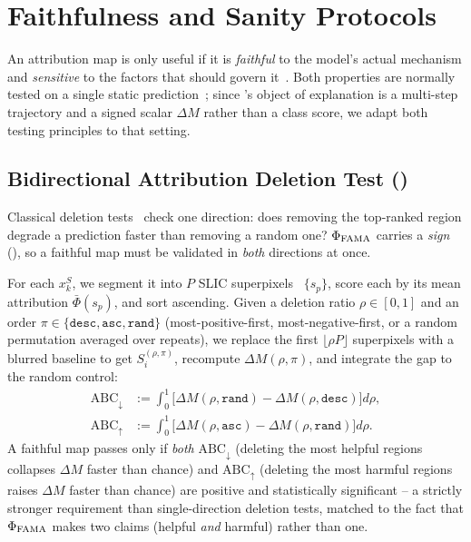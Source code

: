 \section{Faithfulness and Sanity Protocols}
\label{sec:protocols}

An attribution map is only useful if it is \emph{faithful} to the model's actual mechanism and \emph{sensitive} to the factors that should govern it~\cite{eu2019trustworthy}. Both properties are normally tested on a single static prediction~\cite{samek2016evaluating,petsiuk2018rise,adebayo2018sanity}; since \fama's object of explanation is a multi-step trajectory and a signed scalar $\Delta M$ rather than a class score, we adapt both testing principles to that setting.

\subsection{Bidirectional Attribution Deletion Test (\biadt)}
\label{sec:biadt}

Classical deletion tests~\cite{samek2016evaluating,petsiuk2018rise} check one direction: does removing the top-ranked region degrade a prediction faster than removing a random one? $\Phi_{\mathrm{FAMA}}$ carries a \emph{sign} (), so a faithful map must be validated in \emph{both} directions at once.

For each $x_k^S$, we segment it into $P$ SLIC superpixels~\cite{achanta2012slic} $\{s_p\}$, score each by its mean attribution $\bar\Phi(s_p)$, and sort ascending. Given a deletion ratio $\rho\in[0,1]$ and an order $\pi\in\{\texttt{desc},\texttt{asc},\texttt{rand}\}$ (most-positive-first, most-negative-first, or a random permutation averaged over repeats), we replace the first $\lfloor\rho P\rfloor$ superpixels with a blurred baseline to get $S_i^{(\rho,\pi)}$, recompute $\Delta M(\rho,\pi)$, and integrate the gap to the random control:
\begin{equation}
\begin{split}
    \mathrm{ABC}_{\downarrow} &:= \textstyle\int_0^1\!\big[\Delta M(\rho,\texttt{rand}){-}\Delta M(\rho,\texttt{desc})\big]d\rho,\\
    \mathrm{ABC}_{\uparrow} &:= \textstyle\int_0^1\!\big[\Delta M(\rho,\texttt{asc}){-}\Delta M(\rho,\texttt{rand})\big]d\rho.
\end{split}
\label{eq:abc_metric}
\end{equation}
A faithful map passes \biadt only if \emph{both} $\mathrm{ABC}_\downarrow$ (deleting the most helpful regions collapses $\Delta M$ faster than chance) and $\mathrm{ABC}_\uparrow$ (deleting the most harmful regions raises $\Delta M$ faster than chance) are positive and statistically significant -- a strictly stronger requirement than single-direction deletion tests, matched to the fact that $\Phi_{\mathrm{FAMA}}$ makes two claims (helpful \emph{and} harmful) rather than one.

